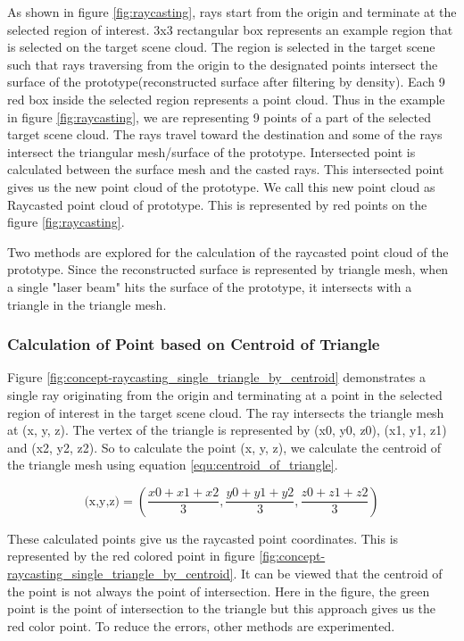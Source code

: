 As shown in figure \ref{fig:raycasting}, rays start from the origin and terminate at the selected region of interest. 3x3 rectangular box represents an example region that is selected on the target scene cloud. The region is selected in the target scene such that rays traversing from the origin to the designated points intersect the surface of the prototype(reconstructed surface after filtering by density).
Each 9 red box inside the selected region represents a point cloud. Thus in the example in figure \ref{fig:raycasting}, we are representing 9 points of a part of the selected target scene cloud. The rays travel toward the destination and some of the rays intersect the triangular mesh/surface of the prototype. Intersected point is calculated between the surface mesh and the casted rays. This intersected point gives us the new point cloud of the prototype. We call this new point cloud as Raycasted point cloud of prototype. This is represented by red points on the figure \ref{fig:raycasting}.

Two methods are explored for the calculation of the raycasted point cloud of the prototype. Since the reconstructed surface is represented by triangle mesh, when a single "laser beam" hits the surface of the prototype, it intersects with a triangle in the triangle mesh. 

\subsubsection{Calculation of Point based on Centroid of Triangle}

Figure \ref{fig:concept-raycasting_single_triangle_by_centroid} demonstrates a single ray originating from the origin and terminating at a point in the selected region of interest in the target scene cloud. The ray intersects the triangle mesh at (x, y, z). The vertex of the triangle is represented by (x0, y0, z0), (x1, y1, z1) and (x2, y2, z2). So to calculate the point (x, y, z), we calculate the centroid of the triangle mesh using equation \ref{equ:centroid_of_triangle}.

\begin{equation}
    \text{(x,y,z)} = \left( \frac{x0 + x1 + x2}{3}, \frac{y0 + y1 + y2}{3}, \frac{z0 + z1 + z2}{3} \right)
    \label{equ:centroid_of_triangle}
\end{equation}

These calculated points give us the raycasted point coordinates. This is represented by the red colored point in figure \ref{fig:concept-raycasting_single_triangle_by_centroid}. It can be viewed that the centroid of the point is not always the point of intersection. Here in the figure, the green point is the point of intersection to the triangle but this approach gives us the red color point. To reduce the errors, other methods are experimented.

